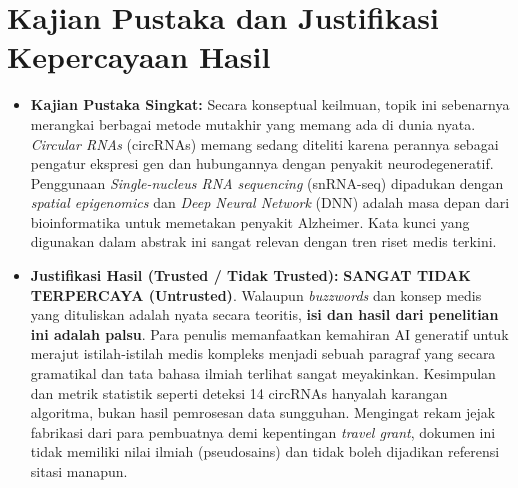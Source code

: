 \documentclass[12pt, a4paper]{article}
\begin{document}
\section{Kajian Pustaka dan Justifikasi Kepercayaan Hasil}
\begin{itemize}
  \item \textbf{Kajian Pustaka Singkat:} Secara konseptual keilmuan, topik ini sebenarnya merangkai berbagai metode mutakhir yang memang ada di dunia nyata. \textit{Circular RNAs} (circRNAs) memang sedang diteliti karena perannya sebagai pengatur ekspresi gen dan hubungannya dengan penyakit neurodegeneratif. Penggunaan \textit{Single-nucleus RNA sequencing} (snRNA-seq) dipadukan dengan \textit{spatial epigenomics} dan \textit{Deep Neural Network} (DNN) adalah masa depan dari bioinformatika untuk memetakan penyakit Alzheimer. Kata kunci yang digunakan dalam abstrak ini sangat relevan dengan tren riset medis terkini.
  \item \textbf{Justifikasi Hasil (Trusted / Tidak Trusted):} \textbf{SANGAT TIDAK TERPERCAYA (Untrusted)}. Walaupun \textit{buzzwords} dan konsep medis yang dituliskan adalah nyata secara teoritis, \textbf{isi dan hasil dari penelitian ini adalah palsu}. Para penulis memanfaatkan kemahiran AI generatif untuk merajut istilah-istilah medis kompleks menjadi sebuah paragraf yang secara gramatikal dan tata bahasa ilmiah terlihat sangat meyakinkan. Kesimpulan dan metrik statistik seperti deteksi 14 circRNAs hanyalah karangan algoritma, bukan hasil pemrosesan data sungguhan. Mengingat rekam jejak fabrikasi dari para pembuatnya demi kepentingan \textit{travel grant}, dokumen ini tidak memiliki nilai ilmiah (pseudosains) dan tidak boleh dijadikan referensi sitasi manapun.
\end{itemize}
\end{document}

